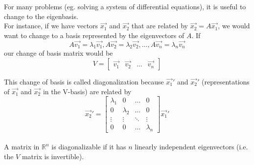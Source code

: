 \begin{enumerate}



\bigskip

\begin{adjustwidth}{-20pt}{0pt}

For many problems (eg. solving a system of differential equations), it is useful to change to the eigenbasis. \\
For instance, if we have vectors $\vec{x_1}$ and $\vec{x_2}$ that are related by $\vec{x_2} = A \vec{x_1}$, we would want to change to a basis represented by the eigenvectors of $A$.
If $$A \vec{v_1} = \lambda_1 \vec{v_1}, A \vec{v_2} = \lambda_2 \vec{v_2}, \dots, A\vec{v_n} = \lambda_n \vec{v_n} $$
our change of basis matrix would be
$$ V =
\begin{bmatrix}
\vec{v_1} & \vec{v_2} & \dots & \vec{v_n}
\end{bmatrix}
$$

This change of basis is called diagonalization because $\vec{x_1}'$ and $\vec{x_2}'$ (representations of $\vec{x_1}$ and $\vec{x_2}$ in the V-basis) are related by
$$ \vec{x_2}' =
\begin{bmatrix}
\lambda_1 & 0 & \dots & 0 \\
0 & \lambda_2 & \dots & 0 \\
\vdots & \vdots & \ddots & \vdots \\
0 & 0 & \dots & \lambda_n
\end{bmatrix} \vec{x_1}'
$$ \\
A matrix in $\mathbb{R}^{n}$ is diagonalizable if it has $n$ linearly independent eigenvectors (i.e. the $V$ matrix is invertible).

\end{adjustwidth}

\bigskip


\end{enumerate}
